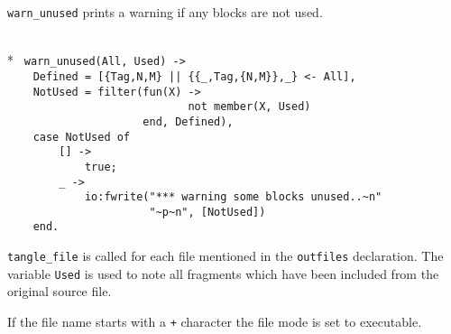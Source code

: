 \verb+warn_unused+ prints a warning if any blocks are not used.

\begin{flushleft}
\label{etangle_2_4}
\\*
\tt
\noindent{}%
\verb&warn_unused(All, Used) ->&\\
\noindent{}%
\verb&    Defined = [{Tag,N,M} || {{_,Tag,{N,M}},_} <- All],&\\
\noindent{}%
\verb&    NotUsed = filter(fun(X) -> &\\
\noindent{}%
\verb&                            not member(X, Used) &\\
\noindent{}%
\verb&                     end, Defined),&\\
\noindent{}%
\verb&    case NotUsed of&\\
\noindent{}%
\verb&        [] ->&\\
\noindent{}%
\verb&            true;&\\
\noindent{}%
\verb&        _ ->&\\
\noindent{}%
\verb&            io:fwrite("*** warning some blocks unused..~n"&\\
\noindent{}%
\verb&                      "~p~n", [NotUsed])&\\
\noindent{}%
\verb&    end.&\\
\end{flushleft}
    \verb+tangle_file+ is   called   for each file  mentioned   in the
\verb+outfiles+ declaration. The variable  \verb+Used+ is used to
note all fragments which have been included from the original source file.
    
If the file name starts with a \verb|+| character the file
mode is set to executable.

